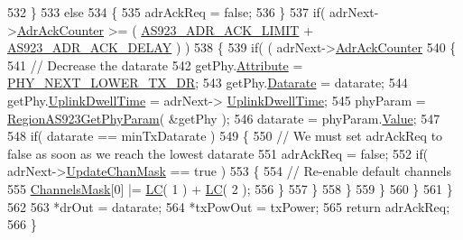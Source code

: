 \begin{DoxyCode}
532             \}
533             \textcolor{keywordflow}{else}
534             \{
535                 adrAckReq = \textcolor{keyword}{false};
536             \}
537             \textcolor{keywordflow}{if}( adrNext->\mbox{\hyperlink{structs_adr_next_params_a24f0356a3491bf07be9ac99ffa33896a}{AdrAckCounter}} >= ( \mbox{\hyperlink{group___r_e_g_i_o_n_a_s923_ga83b8b9ab4bab852209f471da8518bf2d}{AS923\_ADR\_ACK\_LIMIT}} + 
      \mbox{\hyperlink{group___r_e_g_i_o_n_a_s923_ga77d7f3a0e26d3bfeded53fce115d5180}{AS923\_ADR\_ACK\_DELAY}} ) )
538             \{
539                 \textcolor{keywordflow}{if}( ( adrNext->\mbox{\hyperlink{structs_adr_next_params_a24f0356a3491bf07be9ac99ffa33896a}{AdrAckCounter}} %
540                 \{
541                     \textcolor{comment}{// Decrease the datarate}
542                     getPhy.\mbox{\hyperlink{structs_get_phy_params_abdcb168ffd6913b85e2f635d7a475f2d}{Attribute}} = \mbox{\hyperlink{group___r_e_g_i_o_n_gga51cbe8f5433d914fe9cf81b451de2c2dac002e7e492cf30dbf9c544b062f5cc8a}{PHY\_NEXT\_LOWER\_TX\_DR}};
543                     getPhy.\mbox{\hyperlink{structs_get_phy_params_ae2f6080f3aa0e9485c55513ca56bb24d}{Datarate}} = datarate;
544                     getPhy.\mbox{\hyperlink{structs_get_phy_params_a0e6663762d6f9173bc8d8cb018f8f17a}{UplinkDwellTime}} = adrNext->
      \mbox{\hyperlink{structs_adr_next_params_a0e6663762d6f9173bc8d8cb018f8f17a}{UplinkDwellTime}};
545                     phyParam = \mbox{\hyperlink{group___r_e_g_i_o_n_a_s923_ga20508dee35c0f25ff507478c5235fdeb}{RegionAS923GetPhyParam}}( &getPhy );
546                     datarate = phyParam.\mbox{\hyperlink{unionu_phy_param_a8e0dcce3428a8051614e852b8836d0d1}{Value}};
547 
548                     \textcolor{keywordflow}{if}( datarate == minTxDatarate )
549                     \{
550                         \textcolor{comment}{// We must set adrAckReq to false as soon as we reach the lowest datarate}
551                         adrAckReq = \textcolor{keyword}{false};
552                         \textcolor{keywordflow}{if}( adrNext->\mbox{\hyperlink{structs_adr_next_params_a708080da9c63d868556b2c48cb53003b}{UpdateChanMask}} == \textcolor{keyword}{true} )
553                         \{
554                             \textcolor{comment}{// Re-enable default channels}
555                             \mbox{\hyperlink{_region_a_s923_8c_a2188957b5ca6af8092154d7ccbfa5757}{ChannelsMask}}[0] |= \mbox{\hyperlink{group___r_e_g_i_o_n_ga12fa17e5c1016e01a9d82c25027deb1b}{LC}}( 1 ) + \mbox{\hyperlink{group___r_e_g_i_o_n_ga12fa17e5c1016e01a9d82c25027deb1b}{LC}}( 2 );
556                         \}
557                     \}
558                 \}
559             \}
560         \}
561     \}
562 
563     *drOut = datarate;
564     *txPowOut = txPower;
565     \textcolor{keywordflow}{return} adrAckReq;
566 \}
\end{DoxyCode}
